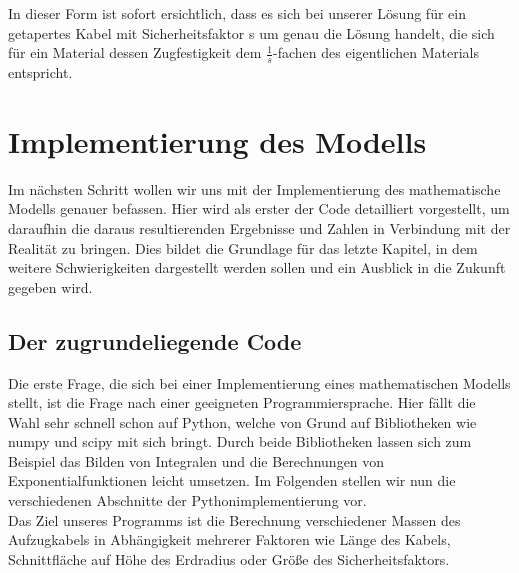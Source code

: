 \documentclass[a4paper, 10pt]{report}
\begin{document}
In dieser Form ist sofort ersichtlich, dass es sich bei unserer Lösung für ein getapertes Kabel mit Sicherheitsfaktor s um genau die Lösung handelt, die sich für ein Material dessen Zugfestigkeit dem $\frac{1}{s}$-fachen des eigentlichen Materials entspricht.

\chapter{Implementierung des Modells}
Im nächsten Schritt wollen wir uns mit der Implementierung des mathematische Modells genauer befassen. Hier wird als erster der Code detailliert vorgestellt, um daraufhin die daraus resultierenden Ergebnisse und Zahlen in Verbindung mit der Realität zu bringen. Dies bildet die Grundlage für das letzte Kapitel, in dem weitere Schwierigkeiten dargestellt werden sollen und ein Ausblick in die Zukunft gegeben wird.
\section{Der zugrundeliegende Code}
Die erste Frage, die sich bei einer Implementierung eines mathematischen Modells stellt, ist die Frage nach einer geeigneten Programmiersprache. Hier fällt die Wahl sehr schnell schon auf Python, welche von Grund auf Bibliotheken wie numpy und scipy mit sich bringt. Durch beide Bibliotheken lassen sich zum Beispiel das Bilden von Integralen und die Berechnungen von Exponentialfunktionen leicht umsetzen. 
Im Folgenden stellen wir nun die verschiedenen Abschnitte der Pythonimplementierung vor.\\
Das Ziel unseres Programms ist die Berechnung verschiedener Massen des Aufzugkabels in Abhängigkeit mehrerer Faktoren wie Länge des Kabels, Schnittfläche auf Höhe des Erdradius oder Größe des Sicherheitsfaktors.
 
\end{document}

